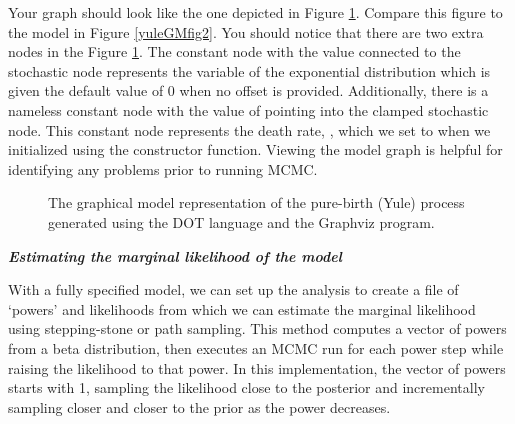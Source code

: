 Your graph should look like the one depicted in Figure \ref{yuleGMGVfig}.
Compare this figure to the model in Figure \ref{yuleGMfig2}.
You should notice that there are two extra nodes in the Figure \ref{yuleGMGVfig}. 
The constant node with the value  connected to the  stochastic node represents the  variable of the exponential distribution which is given the default value of 0 when no offset is provided. 
Additionally, there is a nameless constant node with the value of  pointing into the clamped  stochastic node. 
This constant node represents the death rate, , which we set to  when we initialized  using the  constructor function.
Viewing the model graph is helpful for identifying any problems prior to running MCMC. 
\begin{figure}[h!]
\centering
{}
\caption{\small The graphical model representation of the pure-birth (Yule) process generated using the DOT language and the Graphviz program.}
\label{yuleGMGVfig}
\end{figure}


\textbf{\textit{Estimating the marginal likelihood of the model}}

With a fully specified model, we can set up the  analysis to create a file of `powers' and likelihoods from which we can estimate the marginal likelihood using stepping-stone or path sampling. 
This method computes a vector of powers from a beta distribution, then executes an MCMC run for each power step while raising the likelihood to that power. In this implementation, the vector of powers starts with 1, sampling the likelihood close to the posterior and incrementally sampling closer and closer to the prior as the power decreases. 


